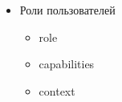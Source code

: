 \documentclass[a4paper, 14pt]{extarticle}
\begin{document}
\begin{itemize}
\begin{itemize}
      \item user\_preference
      \item user\_private\_key
    \end{itemize}
  \item Роли пользователей
    \begin{itemize}
      \item role
      \item capabilities
      \item context

\end{itemize}
\end{itemize}
\end{document}
